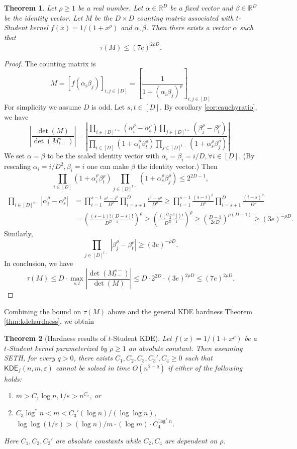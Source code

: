 \documentclass[10pt,a4paper]{article}
\newtheorem{theorem}{Theorem}
\theoremstyle{remark}
\numberwithin{equation}{section}
\numberwithin{theorem}{section}
\newcommand{\R}{\ensuremath{\mathbb{R}}}
\newcommand{\eps}{\varepsilon}
\newcommand{\KDE}{\mathsf{KDE}}
\begin{document}
\begin{theorem}
Let $\rho \ge 1$ be a real number. Let $\alpha \in \R^D$ be a fixed vector and $\beta \in \R^D$ be the identity vector.
Let $M$ be the $D \times D$ counting matrix associated with $t$-Student kernel $f(x) = 1/(1+x^{\rho})$ and $\alpha, \beta$. Then there exists a vector $\alpha$ such that
\[\tau(M) \le (7e)^{2\rho D} .\]
\end{theorem}
\begin{proof}
The counting matrix is
\[M = [f(\alpha_i\beta_j)]_{i, j \in [D]} = 
\left[\frac{1}{1 + (\alpha_i\beta_j)^{\rho}}\right]_{i, j \in [D]}\]
For simplicity we assume $D$ is odd. Let $s, t \in [D]$. By corollary \ref{cor:cauchyratio}, we have
\[\left|\frac{\det(M)}{\det(M^{s-}_{t-})}\right|
=\left|\frac{\prod_{i\in [D]^{s-}}(\alpha_i^\rho - \alpha_s^\rho)
\prod_{j\in [D]^{t-}}(\beta_j^\rho - \beta_t^\rho)}
{\prod_{i \in [D]}(1 + \alpha_i^\rho\beta_t^\rho)
\prod_{j \in [D]^{t-}}(1 + \alpha_s^\rho \beta_j^\rho)}\right|.\]
We set $\alpha = \beta$ to be the scaled identity vector with $\alpha_i = \beta_i = i/D, \forall i \in [D]$.
(By rescaling $\alpha_i = i/D^2, \beta_i = i$ one can make $\beta$ the identity vector.)
Then
\[\prod_{i \in [D]}(1 + \alpha_i^\rho\beta_t^\rho)
\prod_{j \in [D]^{t-}}(1 + \alpha_s^\rho \beta_j^\rho) \le 2^{2D-1},\]
\begin{align*}\prod_{i\in [D]^{s-}}|\alpha_i^\rho - \alpha_s^\rho|
&=\prod_{i = 1}^{s-1}\frac{s^\rho - i^\rho}{D^{\rho}}
\prod_{i = s+1}^{D}\frac{i^\rho - s^\rho}{D^{\rho}}
\ge \prod_{i = 1}^{s-1}\frac{(s-i)^\rho}{D^{\rho}}
\prod_{i = s+1}^{D}\frac{(i-s)^\rho}{D^{\rho}} \\
&=\left(\frac{(s-1)!(D-s)!}{D^{D-1}}\right)^\rho
\ge \left(\frac{(\lfloor\frac{D-1}2\rfloor)!}{D^{D-1}}\right)^{\rho}
\ge \left(\frac{D-1}{2eD}\right)^{\rho(D-1)} \ge (3e)^{-\rho D}.
\end{align*}
Similarly,
\[\prod_{j\in [D]^{t-}}|\beta_j^\rho - \beta_t^\rho| \ge (3e)^{-\rho D}.\]
In conclusion, we have
\[\tau(M) \le D \cdot \max_{s, t}\left|\frac{\det(M^{s-}_{t-})}{\det(M)}\right|
\le D \cdot 2^{2D} \cdot (3e)^{2\rho D} \le (7e)^{2\rho D}.\]
\end{proof}

Combining the bound on $\tau(M)$ above and the general KDE hardness Theorem \ref{thm:kdehardness}, we obtain

\begin{theorem}[Hardness results of $t$-Student KDE]
Let $f(x) = 1/(1+x^\rho)$ be a $t$-Student kernel parameterized by $\rho \ge 1$ an absolute constant.
Then assuming SETH, for every $q > 0$, there exists $C_1, C_2, C_3, C_3', C_4 \ge 0$ such that $\KDE_f(n, m, \eps)$ cannot be solved in time $O(n^{2-q})$ if either of the following holds:
\begin{enumerate}[(1)]
\item $m > C_1\log n, 1/\eps > n^{C_2}$, or
\item $C_3\log^* n < m < C_3'(\log n)/(\log\log n)$, $\log\log(1/\eps) > (\log n)/m \cdot (\log m) \cdot C_4^{\log^*n}$.
\end{enumerate}
Here $C_1, C_3, C_3'$ are absolute constants while $C_2, C_4$ are dependent on $\rho$.
\end{theorem}
\end{document}
